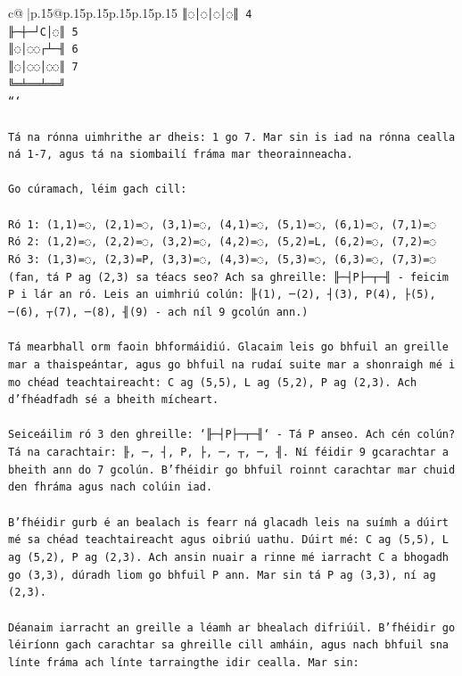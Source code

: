 \documentclass{article}
\begin{document}
{\begin{supertabular}{c@{$\;$}|p{.15\linewidth}@{}p{.15\linewidth}p{.15\linewidth}p{.15\linewidth}p{.15\linewidth}p{.15\linewidth}}
{{{\texttt{║◌│◌│◌│◌║ 4} \\
\texttt{╟─┼─┘C│◌║ 5} \\
\texttt{║◌│◌◌┌┴─╢ 6} \\
\texttt{║◌│◌◌│◌◌║ 7} \\
\texttt{╚═╧══╧══╝} \\
\texttt{```} \\
\\ 
\texttt{Tá na rónna uimhrithe ar dheis: 1 go 7. Mar sin is iad na rónna cealla ná 1{-}7, agus tá na siombailí fráma mar theorainneacha.} \\
\\ 
\texttt{Go cúramach, léim gach cill:} \\
\\ 
\texttt{Ró 1: (1,1)=◌, (2,1)=◌, (3,1)=◌, (4,1)=◌, (5,1)=◌, (6,1)=◌, (7,1)=◌} \\
\texttt{Ró 2: (1,2)=◌, (2,2)=◌, (3,2)=◌, (4,2)=◌, (5,2)=L, (6,2)=◌, (7,2)=◌} \\
\texttt{Ró 3: (1,3)=◌, (2,3)=P, (3,3)=◌, (4,3)=◌, (5,3)=◌, (6,3)=◌, (7,3)=◌  (fan, tá P ag (2,3) sa téacs seo? Ach sa ghreille: ╟─┤P├─┬─╢ {-} feicim P i lár an ró. Leis an uimhriú colún: ╟(1), ─(2), ┤(3), P(4), ├(5), ─(6), ┬(7), ─(8), ╢(9) {-} ach níl 9 gcolún ann.)} \\
\\ 
\texttt{Tá mearbhall orm faoin bhformáidiú. Glacaim leis go bhfuil an greille mar a thaispeántar, agus go bhfuil na rudaí suite mar a shonraigh mé i mo chéad teachtaireacht: C ag (5,5), L ag (5,2), P ag (2,3). Ach d'fhéadfadh sé a bheith mícheart.} \\
\\ 
\texttt{Seiceáilim ró 3 den ghreille: `╟─┤P├─┬─╢` {-} Tá P anseo. Ach cén colún? Tá na carachtair: ╟, ─, ┤, P, ├, ─, ┬, ─, ╢. Ní féidir 9 gcarachtar a bheith ann do 7 gcolún. B'fhéidir go bhfuil roinnt carachtar mar chuid den fhráma agus nach colúin iad.} \\
\\ 
\texttt{B'fhéidir gurb é an bealach is fearr ná glacadh leis na suímh a dúirt mé sa chéad teachtaireacht agus oibriú uathu. Dúirt mé: C ag (5,5), L ag (5,2), P ag (2,3). Ach ansin nuair a rinne mé iarracht C a bhogadh go (3,3), dúradh liom go bhfuil P ann. Mar sin tá P ag (3,3), ní ag (2,3).} \\
\\ 
\texttt{Déanaim iarracht an greille a léamh ar bhealach difriúil. B'fhéidir go léiríonn gach carachtar sa ghreille cill amháin, agus nach bhfuil sna línte fráma ach línte tarraingthe idir cealla. Mar sin:} \\
}}}
\end{supertabular}}
\end{document}
